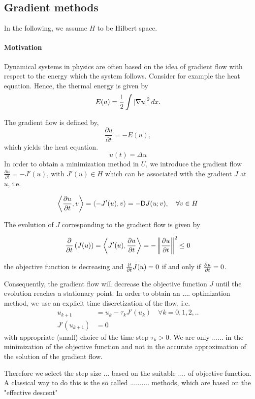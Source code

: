 \subsection{Gradient methods}
In the following, we assume $H$ to be Hilbert space.
\paragraph{Motivation}
	Dynamical systems in physics are often based on the idea of gradient flow with respect to the energy which the system follows. Consider for example the heat equation. Hence, the thermal energy is given by
	\[
		E(u)=\frac{1}{2}\int \left|\nabla u\right|^2 dx.
	\]
	
	The gradient flow is defined by,
	\[
		\frac{\partial u}{\partial t} = -E(u),
	\]
	which yields the heat equation.
	\[
		\dot{u}(t)=\Delta u
	\]
In order to obtain a minimization method in $U$, we introduce the gradient flow $\frac{\partial u}{\partial t} = -J'(u)$, with $J'(u)\in H$ which can be associated with the gradient $J$ at $u$, i.e.

\[
	\left\langle \frac{\partial u}{{\partial t}}, v \right\rangle = \left\langle-J'(u), v\right\rangle = -\mathsf{D}J(u;v), \quad \forall v \in H
\]

The evolution of $J$ corresponding to the gradient flow is given by

\[
	\frac{\partial}{\partial t} \left(J(u)\right) = \left\langle J'(u), \frac{\partial u}{{\partial t}} \right\rangle = -\left\lVert\frac{\partial u}{{\partial t}}\right\rVert^2 \leq 0
\]

the objective function is decreasing and $\frac{\partial }{{\partial t}} J(u) =0$ if and only if $\frac{\partial u}{{\partial t}}=0$.

Consequently, the gradient flow will decrease the objective function $J$ until the evolution reaches a stationary point. In order to obtain an .... optimization method, we use an explicit time discretization of the flow, i.e.
\begin{align*}
u_{k+1}&=u_k - \tau_kJ'(u_k) \quad \forall k=0,1,2,.. \\
J'(u_{k+1})&=0
\end{align*}
with appropriate (small) choice of the time step $\tau_k >0$. We are only ...... in the minimization of the objective function and not in the accurate approximation of the solution of the gradient flow.

Therefore we select the step size ... based on the suitable .... of objective function. A classical way to do this is the so called .......... methods, which are based on the "effective descent"

